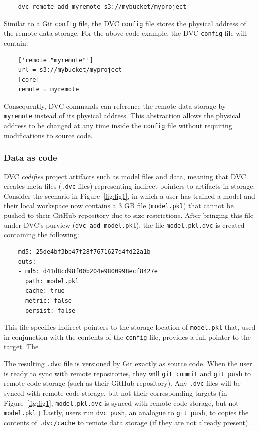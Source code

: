 \documentclass[10pt,sigconf, authordraft]{acmart}
\begin{document}
\begin{verbatim}
    dvc remote add myremote s3://mybucket/myproject
\end{verbatim}


Similar to a Git \verb|config| file, the DVC \verb|config| file stores the physical address of the remote data storage. For the above code example, the DVC \verb|config| file will contain:

\begin{verbatim}
    ['remote "myremote"']
    url = s3://mybucket/myproject
    [core]
    remote = myremote
\end{verbatim}

Consequently, DVC commands can reference the remote data storage by \verb|myremote| instead of its physical address. This abstraction allows the physical address to be changed at any time inside the \verb|config| file without requiring modifications to source code.

\subsubsection{Data as code} 
DVC \textit{codifies} project artifacts such as model files and data, meaning that DVC creates meta-files (\verb|.dvc| files) representing indirect pointers to artifacts in storage. Consider the scenario in Figure~\ref{fig:fig1}, in which a user has trained a model and their local workspace now contains a 3 GB file (\verb|model.pkl|) that cannot be pushed to their GitHub repository due to size restrictions. After bringing this file under DVC's purview (\verb|dvc add model.pkl|), the file \verb|model.pkl.dvc| is created containing the following:

\begin{verbatim}
    md5: 25de4bf3bb47f28f7671627d4fd22a1b
    outs:
    - md5: d41d8cd98f00b204e9800998ecf8427e
      path: model.pkl
      cache: true
      metric: false
      persist: false
\end{verbatim}

This file specifies indirect pointers to the storage location of \verb|model.pkl| that, used in conjunction with the contents of the \verb|config| file, provides a full pointer to the target. The 


The resulting \verb|.dvc| file is versioned by Git exactly as source code. When the user is ready to sync with remote repositories, they will \verb|git commit| and \verb|git push| to remote code storage (such as their GitHub repository). Any \verb|.dvc| files will be synced with remote code storage, but not their corresponding targets (in Figure~\ref{fig:fig1}, \verb|model.pkl.dvc| is synced with remote code storage, but not \verb|model.pkl|.) Lastly, users run \verb|dvc push|, an analogue to \verb|git push|, to copies the contents of \verb|.dvc/cache| to remote data storage (if they are not already present). 
\end{document}
